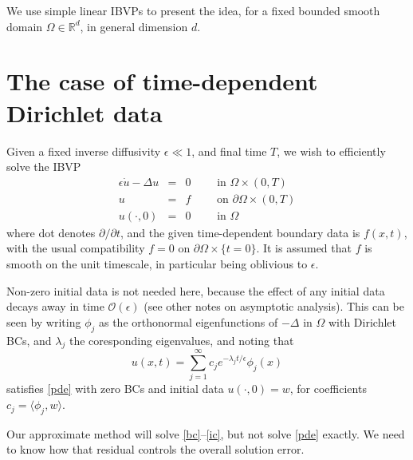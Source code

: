 \documentclass[10pt]{article}
\newcommand{\bea}{\begin{eqnarray}}
\newcommand{\eea}{\end{eqnarray}}
\newcommand{\R}{\mathbb{R}}
\newcommand{\bigO}{{\mathcal O}}
\newcommand{\pO}{{\partial\Omega}}
\newcommand{\eps}{\epsilon}
\begin{document}
We use simple linear IBVPs to present the idea, for a fixed
bounded smooth domain $\Omega \in \R^d$, in general dimension $d$.


\section{The case of time-dependent Dirichlet data}

Given a fixed inverse diffusivity $\eps\ll 1$,
and final time $T$,
we wish to efficiently solve the IBVP
\bea
\eps\dot{u} - \Delta u &=& 0    \qquad \mbox{ in } \Omega\times (0,T)
\label{pde}
\\
u  &=& f  \qquad \mbox{ on } \pO \times (0,T)
\label{bc}
\\
u(\cdot, 0)    &=&  0 \qquad \mbox{ in } \Omega
\label{ic}
\eea
where dot denotes $\partial/\partial t$, and the given
time-dependent boundary data is $f(x,t)$,
with the usual compatibility $f=0$ on  $\pO\times\{t=0\}$.
It is assumed that $f$ is smooth on the unit timescale, in particular
being oblivious to $\eps$.

Non-zero initial data is not needed here,
because the effect of any initial data decays away
in time $\bigO(\eps)$ (see other notes on asymptotic analysis).
This can be seen by writing $\phi_j$ as the orthonormal eigenfunctions
of $-\Delta$ in $\Omega$ with Dirichlet BCs, and $\lambda_j$
the coresponding eigenvalues, and noting that
$$
u(x,t) = \sum_{j=1}^\infty c_j e^{-\lambda_jt/\eps} \phi_j(x)
$$
satisfies \eqref{pde} with zero BCs and initial data $u(\cdot,0)=w$,
for coefficients $c_j = \langle \phi_j, w \rangle$.

Our approximate method will solve \eqref{bc}--\eqref{ic}, but
not solve \eqref{pde} exactly.
We need to know how that residual controls the overall solution error.
\end{document}

